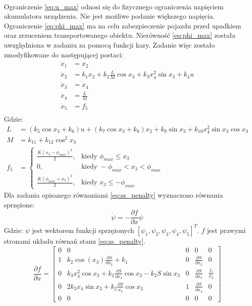 \paragraph*{}
Ograniczenie \eqref{eq:u_max} odnosi się do fizycznego ograniczenia napięciem akumulatora urządzenia. Nie jest możliwe podanie większego napięcia. Ograniczenie \eqref{eq:phi_max} ma na celu zabezpieczenie pojazdu przed upadkiem oraz zrzuceniem transportowanego obiektu. Nierówność \eqref{eq:phi_max} została uwzględniona w zadaniu za pomocą funkcji kary. Zadanie więc zostało zmodyfikowane do następującej postaci:
\begin{equation}
\begin{aligned}
\dot x_1 &=x_2\\
\dot x_2 &=k_1x_2+k_2\frac{L}{M}\cos x_3+k_3x_4^2\sin x_3+k_4u\\
\dot x_3 &=x_4\\
\dot x_4 &=\frac{L}{M}\\
\dot x_5 &=f_5\\
\end{aligned}
\label{eq:ss_penalty}
\end{equation}
\noindent Gdzie:
\begin{equation}
\begin{aligned}
L &=(k_5\cos x_3+k_6)u+(k_7\cos x_3+k_8)x_2+k_9\sin x_3+k_{10}x_4^2\sin x_3\cos x_3\\
M &=k_{11}+k_{12}\cos ^2x_3\\
f_5 &=
	\begin{cases}
	\frac{K(x_3-\phi_{max})^2}{2}, & \text{kiedy } \phi_{max}\leqslant x_3\\
	0, & \text{kiedy } -\phi_{max}<x_3<\phi_{max}\\
	\frac{K(\phi_{max}+x_3)^2}{2}, & \text{kiedy } x_3\leqslant -\phi_{max}
	\end{cases}
\end{aligned}
\end{equation}
Dla zadania opisanego równaniami \eqref{eq:ss_penalty} wyznaczono równania sprzężone:
\begin{equation}
\dot \psi=-\frac{\partial f}{\partial x}\psi
\end{equation}
\noindent Gdzie:\newline
\(\psi\) jest wektorem funkcji sprzężonych \([\psi_1, \psi_2, \psi_3, \psi_4, \psi_5]^T\).\newline
\(f\) jest prawymi stronami układu równań stanu \eqref{eq:ss_penalty}.
\begin{equation}
\frac{\partial f}{\partial x}=\begin{bmatrix}
0 & 0 & 0 & 0 & 0\\
1 & k_2\cos(x_3)\frac{\partial S}{\partial x_2}+k_1 & 0 & \frac{\partial S}{\partial x_2} & 0\\
0 & k_3x_4^2\cos x_3+k_2\frac{\partial S}{\partial x_3}\cos x_3-k_2S\sin x_3 & 0 & \frac{\partial S}{\partial x_3} & \frac{f_5}{x_3}\\
0 & 2k_3x_4\sin x_3+k_2\frac{\partial S}{x_4}\cos x_3 & 1 & \frac{\partial S}{\partial x_4} & 0\\
0 & 0 & 0 & 0 & 0
\end{bmatrix}
\end{equation}
